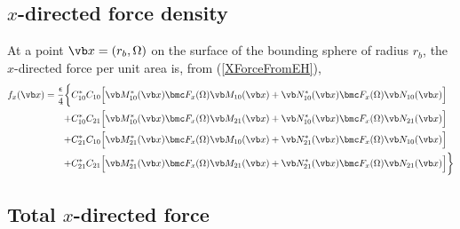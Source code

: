 \documentclass[letterpaper]{article}
\begin{document}
\subsection{$x$-directed force density}

At a point $\vb x=(r_b, \Omega)$ on the surface of the bounding sphere
of radius $r_b$, the $x$-directed force per unit area is, from
(\ref{XForceFromEH}),
\begin{align*}
f_x(\vb x)
=\frac{\epsilon}{4}
  \bigg\{  &C^*_{10} C_{10} 
            \Big[ \vb M_{10}^*(\vb x) \bmc F_x(\Omega) \vb M_{10}(\vb x) 
                  + \vb N_{10}^*(\vb x) \bmc F_x(\Omega) \vb N_{10}(\vb x) 
            \Big]
\\
          +&C^*_{10} C_{21} 
            \Big[ \vb M_{10}^*(\vb x) \bmc F_x(\Omega) \vb M_{21}(\vb x) 
                  + \vb N_{10}^*(\vb x) \bmc F_x(\Omega) \vb N_{21}(\vb x)
            \Big]
\\
          +&C^*_{21} C_{10} 
            \Big[ \vb M_{21}^*(\vb x) \bmc F_x(\Omega) \vb M_{10}(\vb x) 
                  + \vb N_{21}^*(\vb x) \bmc F_x(\Omega) \vb N_{10}(\vb x)
            \Big]
\\
          +&C^*_{21} C_{21} 
            \Big[ \vb M_{21}^*(\vb x) \bmc F_x(\Omega) \vb M_{21}(\vb x) 
                  + \vb N_{21}^*(\vb x) \bmc F_x(\Omega) \vb N_{21}(\vb x)
            \Big]
  \bigg\}
\end{align*}

\subsection{Total $x$-directed force}
\end{document}
